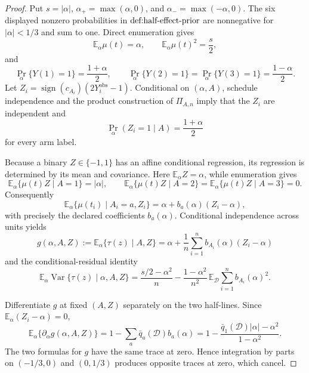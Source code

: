 \documentclass{article}
\begin{document}
\begin{proof}
Put \(s=|\alpha|\), \(\alpha_+=\max(\alpha,0)\), and \(\alpha_-=\max(-\alpha,0)\).  The six displayed nonzero probabilities in \(\textnormal{def:half-effect-prior}\) are nonnegative for \(|\alpha|<1/3\) and sum to one.  Direct enumeration gives
\[
\mathbb E_\alpha\mu(t)=\alpha,
\qquad
\mathbb E_\alpha\mu(t)^2=\frac{s}{2},
\]
and
\[
\Pr_\alpha\{Y(1)=1\}=\frac{1+\alpha}{2},
\qquad
\Pr_\alpha\{Y(2)=1\}=\Pr_\alpha\{Y(3)=1\}=\frac{1-\alpha}{2}.
\]
Let \(Z_i=\operatorname{sign}(c_{A_i})(2Y_i^{\mathrm{obs}}-1)\).  Conditional on \((\alpha,A)\), schedule independence and the product construction of \(\Pi_{A,n}\) imply that the \(Z_i\) are independent and
\[
\Pr_\alpha(Z_i=1\mid A)=\frac{1+\alpha}{2}
\]
for every arm label.

Because a binary \(Z\in\{-1,1\}\) has an affine conditional regression, its regression is determined by its mean and covariance.  Here \(\mathbb E_\alpha Z=\alpha\), while enumeration gives
\[
\mathbb E_\alpha\{\mu(t)Z\mid A=1\}=|\alpha|,
\qquad
\mathbb E_\alpha\{\mu(t)Z\mid A=2\}
=\mathbb E_\alpha\{\mu(t)Z\mid A=3\}=0.
\]
Consequently
\[
\mathbb E_\alpha\{\mu(t_i)\mid A_i=a,Z_i\}
=\alpha+b_a(\alpha)(Z_i-\alpha),
\]
with precisely the declared coefficients \(b_a(\alpha)\).  Conditional independence across units yields
\[
g(\alpha,A,Z):=\mathbb E_\alpha\{\tau(z)\mid A,Z\}
=\alpha+\frac1n\sum_{i=1}^n b_{A_i}(\alpha)(Z_i-\alpha)
\]
and the conditional-residual identity
\[
\mathbb E_\alpha\operatorname{Var}\{\tau(z)\mid\alpha,A,Z\}
=\frac{s/2-\alpha^2}{n}
-\frac{1-\alpha^2}{n^2}\,
\mathbb E_{\mathcal D}\sum_{i=1}^n b_{A_i}(\alpha)^2.
\tag{1}
\]

Differentiate \(g\) at fixed \((A,Z)\) separately on the two half-lines.  Since \(\mathbb E_\alpha(Z_i-\alpha)=0\),
\[
\mathbb E_\alpha\{\partial_\alpha g(\alpha,A,Z)\}
=1-\sum_a\bar q_a(\mathcal D)b_a(\alpha)
=1-\frac{\bar q_1(\mathcal D)|\alpha|-\alpha^2}{1-\alpha^2}.
\tag{2}
\]
The two formulas for \(g\) have the same trace at zero.  Hence integration by parts on \((-1/3,0)\) and \((0,1/3)\) produces opposite traces at zero, which cancel.


\end{proof}
\end{document}
